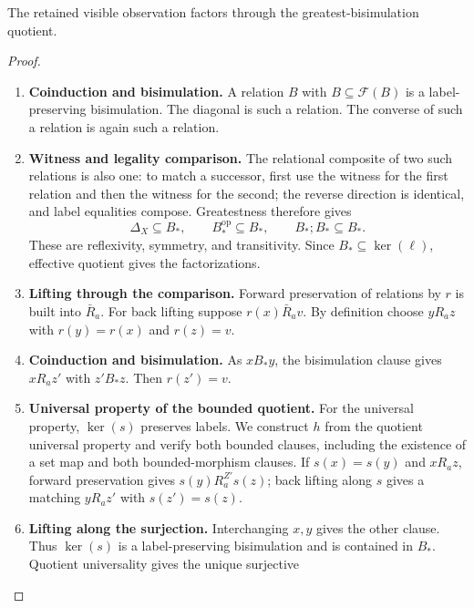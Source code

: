 \documentclass[11pt,a4paper]{article}
\numberwithin{equation}{section}
\theoremstyle{definition}
\theoremstyle{remark}
\theoremstyle{plain}
\begin{document}
\noindent The retained visible observation factors through the greatest-bisimulation quotient.
\begin{center}
\end{center}


\begin{proof}
\leavevmode
\begin{enumerate}[label=\textup{(\arabic*)},leftmargin=*,itemsep=4pt,topsep=3pt]
  \item \textbf{Coinduction and bisimulation.} A relation $B$ with $B\subseteq\mathcal F(B)$ is a label-preserving
bisimulation. The diagonal is such a relation. The converse of such a
relation is again such a relation.
  \item \textbf{Witness and legality comparison.} The relational composite of two such
relations is also one: to match a successor, first use the witness for the
first relation and then the witness for the second; the reverse direction
is identical, and label equalities compose. Greatestness therefore gives
\[
 \Delta_X\subseteq B_*,\qquad B_*^{\mathrm{op}}\subseteq B_*,
 \qquad B_*;B_*\subseteq B_*.
\]
These are reflexivity, symmetry, and transitivity. Since
$B_*\subseteq\ker(\ell)$, effective quotient gives the factorizations.
  \item \textbf{Lifting through the comparison.} Forward preservation of relations by $r$ is built into $\bar R_a$. For back lifting suppose $r(x)\bar R_av$. By definition choose
$yR_az$ with $r(y)=r(x)$ and $r(z)=v$.
  \item \textbf{Coinduction and bisimulation.} As $xB_*y$, the bisimulation
clause gives $xR_az'$ with $z'B_*z$. Then $r(z')=v$.
  \item \textbf{Universal property of the bounded quotient.} For the universal property, $\ker(s)$ preserves labels. We construct
$h$ from the quotient universal property and verify both bounded clauses,
including the existence of a set map and both bounded-morphism clauses. If $s(x)=s(y)$
and $xR_az$, forward preservation gives
$s(y)R_a^{Z'}s(z)$; back lifting along $s$ gives a matching
$yR_az'$ with $s(z')=s(z)$.
  \item \textbf{Lifting along the surjection.} Interchanging $x,y$ gives the other
clause. Thus $\ker(s)$ is a label-preserving bisimulation and is
contained in $B_*$. Quotient universality gives the unique surjective

\end{enumerate}
\end{proof}
\end{document}
